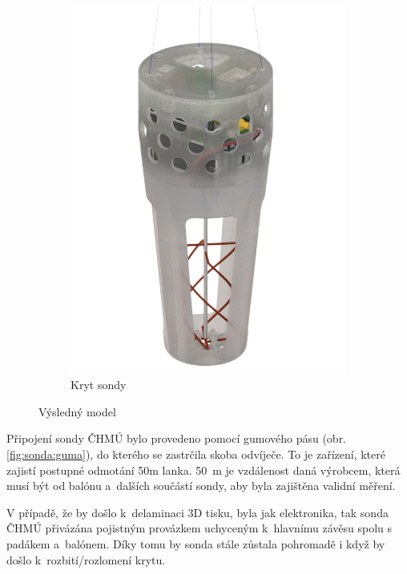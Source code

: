\documentclass[twoside]{ctuthesis}
\theoremstyle{plain}
\theoremstyle{definition}
\theoremstyle{note}
\begin{document}
\begin{figure}[hbtp]
\begin{subfigure}{.49\textwidth}
			\includegraphics[width = .85\textwidth]{Figures/sonda_case.png}
			\caption{Kryt sondy}
			\label{fig:sondacase}
		\end{subfigure}
		\caption{Výsledný model}
		\label{fig:sonda:final}
	\end{figure}


	Připojení sondy ČHMÚ bylo provedeno pomocí gumového pásu (obr. \ref{fig:sonda:guma}), do kterého se zastrčila skoba odvíječe. To je zařízení, které zajistí postupné odmotání 50m lanka. 50~m je vzdálenost daná výrobcem, která musí být od balónu a~dalších součástí sondy, aby byla zajištěna validní měření.

	

	V případě, že by došlo k~delaminaci 3D tisku, byla jak elektronika, tak sonda ČHMÚ přivázána pojistným provázkem uchyceným k~hlavnímu závěsu spolu s padákem a~balónem. Díky tomu by sonda stále zůstala pohromadě i když by došlo k~rozbití/rozlomení krytu.

\end{document}
